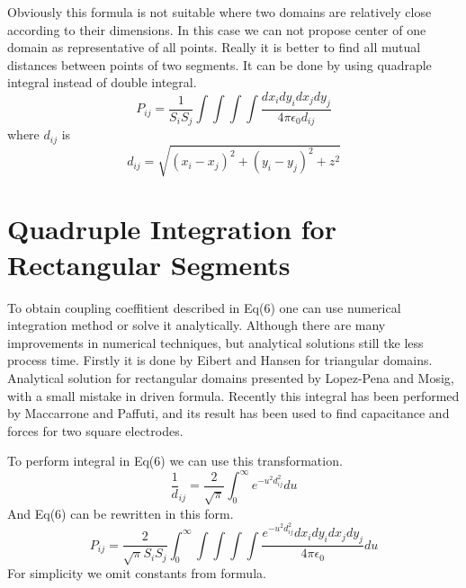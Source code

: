 \documentclass[twoside,twocolumn]{article}
\begin{document}
Obviously this formula is not suitable where two domains are relatively close according to their dimensions. In this case we can not propose center of one domain as representative of all points. Really it is better to find all mutual distances between points of two segments. It can be done by using quadraple integral instead of double integral.
\begin{equation}
\label {eq6}
P_{ij} = \frac 1 {S_i S_j}\int \int \int \int \frac{dx_i dy_i dx_j dy_j}{4 \pi \epsilon_0 d_{ij}}
\end{equation} 
where $d _{ij}$ is 
\begin{equation}
\label {eq7}
d_{ij} = \sqrt{(x_i-x_j)^2 + (y_i-y_j)^2 + z^2}
\end{equation} 

\section{Quadruple Integration for Rectangular Segments}
To obtain coupling coeffitient described in Eq(6) one can use numerical integration method or solve it analytically. Although there are many improvements in numerical techniques, but analytical solutions still tke less process time. Firstly it is done by Eibert and Hansen for triangular domains. Analytical solution for rectangular domains presented by Lopez-Pena and Mosig, with a small mistake in driven formula. Recently this integral has been performed by Maccarrone and Paffuti, and its result has been used to find capacitance and forces for two square electrodes.

To perform integral in Eq(6) we can use this transformation.
\begin{equation}\label {eq8}
\frac 1 d_{ij} = \frac{2}{\sqrt{\pi}}\int_0^{\infty} e^{-u^2 d_{ij}^2 }du
\end{equation}
And Eq(6) can be rewritten in this form.
\begin{equation}
\label {eq9}
P_{ij} = \frac 2 {\sqrt{\pi} S_i S_j}\int_0^{\infty}\int \int \int \int \frac{e^{-u^2 d_{ij}^2 } dx_i dy_i dx_j dy_j}{4 \pi \epsilon_0 } du
\end{equation}
For simplicity we omit constants from formula.
\end{document}
